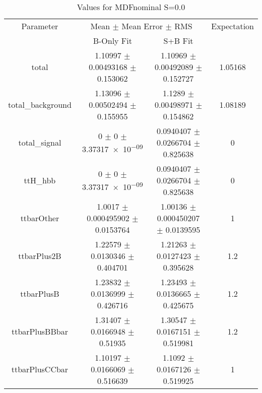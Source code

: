 \begin{table}
\centering
\caption{Values for MDFnominal S=0.0}
\begin{tabular}{cccc}
\toprule
Parameter & \multicolumn{2}{c}{Mean $\pm$ Mean Error $\pm$ RMS} & Expectation\\
 & B-Only Fit & S+B Fit & \\
\midrule
total & \num{1.10997} $\pm$ \num{0.00493168} $\pm$ \num{0.153062} & \num{1.10969} $\pm$ \num{0.00492089} $\pm$ \num{0.152727} & \num{1.05168}\\
total\_background & \num{1.13096} $\pm$ \num{0.00502494} $\pm$ \num{0.155955} & \num{1.1289} $\pm$ \num{0.00498971} $\pm$ \num{0.154862} & \num{1.08189}\\
total\_signal & \num{0} $\pm$ \num{0} $\pm$ \num{3.37317e-09} & \num{0.0940407} $\pm$ \num{0.0266704} $\pm$ \num{0.825638} & \num{0}\\
ttH\_hbb & \num{0} $\pm$ \num{0} $\pm$ \num{3.37317e-09} & \num{0.0940407} $\pm$ \num{0.0266704} $\pm$ \num{0.825638} & \num{0}\\
ttbarOther & \num{1.0017} $\pm$ \num{0.000495902} $\pm$ \num{0.0153764} & \num{1.00136} $\pm$ \num{0.000450207} $\pm$ \num{0.0139595} & \num{1}\\
ttbarPlus2B & \num{1.22579} $\pm$ \num{0.0130346} $\pm$ \num{0.404701} & \num{1.21263} $\pm$ \num{0.0127423} $\pm$ \num{0.395628} & \num{1.2}\\
ttbarPlusB & \num{1.23832} $\pm$ \num{0.0136999} $\pm$ \num{0.426716} & \num{1.23493} $\pm$ \num{0.0136665} $\pm$ \num{0.425675} & \num{1.2}\\
ttbarPlusBBbar & \num{1.31407} $\pm$ \num{0.0166948} $\pm$ \num{0.51935} & \num{1.30547} $\pm$ \num{0.0167151} $\pm$ \num{0.519981} & \num{1.2}\\
ttbarPlusCCbar & \num{1.10197} $\pm$ \num{0.0166069} $\pm$ \num{0.516639} & \num{1.1092} $\pm$ \num{0.0167126} $\pm$ \num{0.519925} & \num{1}\\
\bottomrule
\end{tabular}
\end{table}